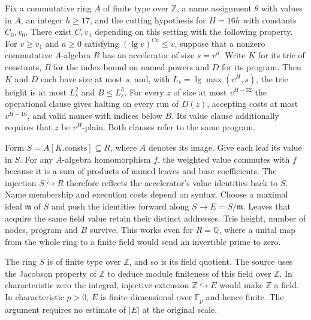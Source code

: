 \clearpage
{}\label{sec:15k6}

Fix a commutative ring $A$ of finite type over $\mathbb Z$, a name assignment $\theta$ with values in $A$, an integer $h\ge17$, and the cutting hypothesis for $H=16h$ with constants $C_0,v_0$. There exist $C,v_1$ depending on this setting with the following property. For $v\ge v_1$ and $a\ge0$ satisfying $(\lg v)^{Ca}\le v$, suppose that a nonzero commutative $A$-algebra $R$ has an accelerator of size $s=v^a$. Write $K$ for its trie of constants, $B$ for the index bound on named powers and $D$ for its program. Then $K$ and $D$ each have size at most $s$, and, with $L_s=\lg\max(v^H,s)$, the trie height is at most $L_s^2$ and $B\le L_s^3$. For every $z$ of size at most $v^{H-32}$ the operational clause gives halting on every run of $D(z)$, accepting costs at most $v^{H-16}$, and valid names with indices below $B$. Its value clause additionally requires that $z$ be $v^H$-plain. Both clauses refer to the same program.

Form $S=A[K.\mathrm{consts}]\subseteq R$, where $A$ denotes its image. Give each leaf its value in $S$. For any $A$-algebra homomorphism $f$, the weighted value commutes with $f$ because it is a sum of products of named leaves and base coefficients. The injection $S\hookrightarrow R$ therefore reflects the accelerator's value identities back to $S$. Name membership and execution costs depend on syntax. Choose a maximal ideal $\mathfrak m$ of $S$ and push the identities forward along $S\to E=S/\mathfrak m$. Leaves that acquire the same field value retain their distinct addresses. Trie height, number of nodes, program and $B$ survive. This works even for $R=\mathbb Q$, where a unital map from the whole ring to a finite field would send an invertible prime to zero.

The ring $S$ is of finite type over $\mathbb Z$, and so is its field quotient. The source uses the Jacobson property of $\mathbb Z$ to deduce module finiteness of this field over $\mathbb Z$. In characteristic zero the integral, injective extension $\mathbb Z\hookrightarrow E$ would make $\mathbb Z$ a field. In characteristic $p>0$, $E$ is finite dimensional over $\mathbb F_p$ and hence finite. The argument requires no estimate of $|E|$ at the original scale.

